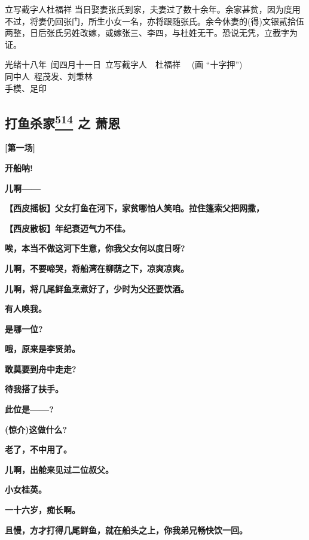 立写截字人杜福祥
当日娶妻张氏到家，夫妻过了数十余年。余家甚贫，因为度用不过，将妻仍回张门，所生小女一名，亦将跟随张氏。余今休妻的(得)文银贰拾伍两整，日后张氏另姓改嫁，或嫁张三、李四，与杜姓无干。恐说无凭，立截字为证。

\begin{flushright}
光绪十八年~闰四月十一日~立写截字人~~杜福祥 ~~(画 ``十字押'') ~~~\\

\large{同中人~程茂发、刘秉林} ~~~~~~~~~~~~~~~ \\

\huge{手模}、\huge{足印} ~~~~~~~~~~~
\end{flushright}

\newpage
\hypertarget{ux6253ux9c7cux6740ux5bb6-ux4e4b-ux8427ux6069}{%
\subsection{\texorpdfstring{打鱼杀家\protect\hyperlink{fn514}{\textsuperscript{514}}
之
萧恩}{打鱼杀家514 之 萧恩}}\label{ux6253ux9c7cux6740ux5bb6-ux4e4b-ux8427ux6069}}

\textbf{{[}第一场{]}}

\textbf{开船呐!}

\textbf{儿啊------}

\textbf{【西皮摇板】父女打鱼在河下，家贫哪怕人笑咱。拉住篷索父把网撒，}

\textbf{【西皮散板】年纪衰迈气力不佳。}

\textbf{唉，本当不做这河下生意，你我父女何以度日呀?}

\textbf{儿啊，不要啼哭，将船湾在柳荫之下，凉爽凉爽。}

\textbf{儿啊，将几尾鲜鱼烹煮好了，少时为父还要饮酒。}

\textbf{有人唤我。}

\textbf{是哪一位?}

\textbf{哦，原来是李贤弟。}

\textbf{敢莫要到舟中走走?}

\textbf{待我搭了扶手。}

\textbf{此位是------?}

\textbf{(惊介)这做什么?}

\textbf{老了，不中用了。}

\textbf{儿啊，出舱来见过二位叔父。}

\textbf{小女桂英。}

\textbf{一十六岁，痴长啊。}

\textbf{且慢，方才打得几尾鲜鱼，就在船头之上，你我弟兄畅快饮一回。}

